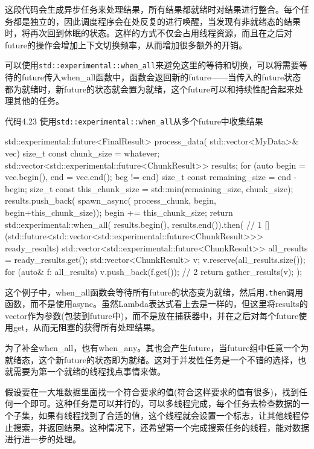 这段代码会生成异步任务来处理结果，所有结果都就绪时对结果进行整合。每个任务都是独立的，因此调度程序会在处反复的进行唤醒，当发现有非就绪态的结果时，将再次回到休眠的状态。这样的方式不仅会占用线程资源，而且在之后对future的操作会增加上下文切换频率，从而增加很多额外的开销。

可以使用\texttt{std::experimental::when\_all}来避免这里的等待和切换，可以将需要等待的future传入when\_all函数中，函数会返回新的future——当传入的future状态都为就绪时，新future的状态就会置为就绪，这个future可以和持续性配合起来处理其他的任务。

代码4.23 使用\texttt{std::experimental::when\_all}从多个future中收集结果

\begin{cpp}
std::experimental::future<FinalResult> process_data(
  std::vector<MyData>& vec)
{
  size_t const chunk_size = whatever;
  std::vector<std::experimental::future<ChunkResult>> results;
  for (auto begin = vec.begin(), end = vec.end(); beg != end){
    size_t const remaining_size = end - begin;
    size_t const this_chunk_size = std::min(remaining_size, chunk_size);
    results.push_back(
      spawn_async(
        process_chunk, begin, begin+this_chunk_size));
    begin += this_chunk_size;
  }
  return std::experimental::when_all(
    results.begin(), results.end()).then( // 1
      [](std::future<std::vector<std::experimental::future<ChunkResult>>> ready_results){
        std::vector<std::experimental::future<ChunkResult>> all_results = ready_results.get();
        std::vector<ChunkResult> v;
        v.reserve(all_results.size());
        for (auto& f: all_results){
          v.push_back(f.get()); // 2
        }
        return gather_results(v);
      });
}
\end{cpp}

这个例子中，when\_all函数会等待所有future的状态变为就绪，然后用\texttt{.then}调用函数，而不是使用async。虽然Lambda表达式看上去是一样的，但这里将results的vector作为参数(包装到future中)，而不是放在捕获器中，并在之后对每个future使用get，从而无阻塞的获得所有处理结果。

为了补全when\_all，也有when\_any。其也会产生future，当future组中任意一个为就绪态，这个新future的状态即为就绪。这对于并发性任务是一个不错的选择，也就需要为第一个就绪的线程找点事情来做。


假设要在一大堆数据里面找一个符合要求的值(符合这样要求的值有很多)，找到任何一个即可。这种任务是可以并行的，可以多线程完成，每个任务去检查数据的一个子集，如果有线程找到了合适的值，这个线程就会设置一个标志，让其他线程停止搜索，并返回结果。这种情况下，还希望第一个完成搜索任务的线程，能对数据进行进一步的处理。

